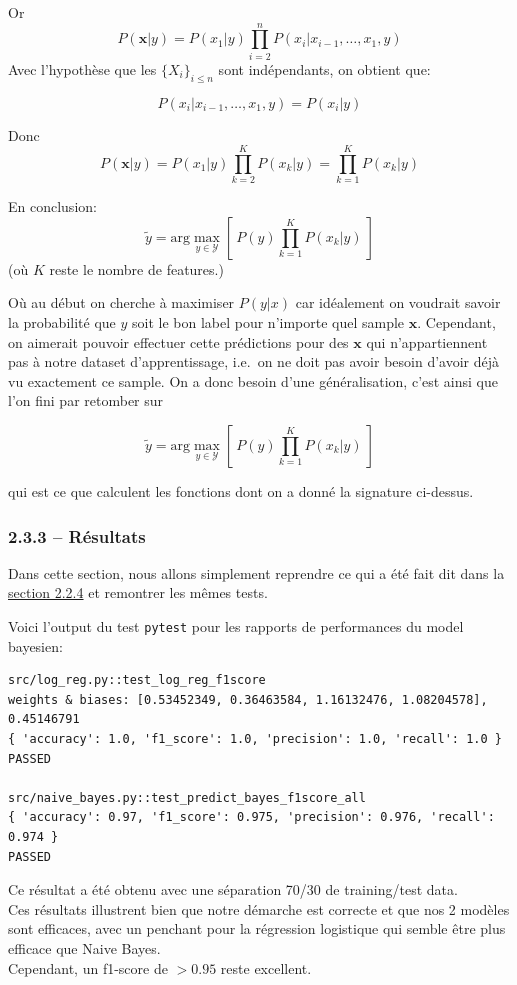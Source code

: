 \documentclass[
]{article}
\begin{document}
Or \[ 
P(\mathbf{x}| y) = P(x_1 | y) \prod_{i = 2}^{n}{P(x_i | x_{i-1}, \ldots, x_1, y)}
\] Avec l'hypothèse que les \(\{X_i\}_{i \leq n}\) sont indépendants, on
obtient que:

\[P(x_i | x_{i-1}, \ldots, x_1, y) = P(x_i | y)\]

Donc
\[P(\mathbf{x}|y) = P(x_1 | y) \prod_{k = 2}^{K}{P(x_k | y)} = \prod_{k=1}^K{P(x_k | y)}\]

En conclusion:
\[ \tilde{y} = \text{arg}\max_{y \in \mathcal{Y}} \left[\  P(y) \prod_{k = 1}^K{P(x_k | y)}\  \right] \]
(où \(K\) reste le nombre de features.)

Où au début on cherche à maximiser \(P(y | x)\) car idéalement on
voudrait savoir la probabilité que \(y\) soit le bon label pour
n'importe quel sample \(\mathbf{x}\). Cependant, on aimerait pouvoir
effectuer cette prédictions pour des \(\mathbf{x}\) qui n'appartiennent
pas à notre dataset d'apprentissage, i.e.~on ne doit pas avoir besoin
d'avoir déjà vu exactement ce sample. On a donc besoin d'une
généralisation, c'est ainsi que l'on fini par retomber sur

\[ \tilde{y} = \text{arg}\max_{y \in \mathcal{Y}} \left[\  P(y) \prod_{k = 1}^K{P(x_k | y)}\  \right] \]

qui est ce que calculent les fonctions dont on a donné la signature
ci-dessus.

\hypertarget{ruxe9sultats-1}{%
\subsubsection{2.3.3 -- Résultats}\label{ruxe9sultats-1}}

Dans cette section, nous allons simplement reprendre ce qui a été fait
dit dans la \href{#ruxe9sultats}{section 2.2.4} et remontrer les mêmes
tests.

Voici l'output du test \texttt{pytest} pour les rapports de performances
du model bayesien:

\begin{lstlisting}
src/log_reg.py::test_log_reg_f1score 
weights & biases: [0.53452349, 0.36463584, 1.16132476, 1.08204578], 0.45146791  
{ 'accuracy': 1.0, 'f1_score': 1.0, 'precision': 1.0, 'recall': 1.0 }
PASSED

src/naive_bayes.py::test_predict_bayes_f1score_all  
{ 'accuracy': 0.97, 'f1_score': 0.975, 'precision': 0.976, 'recall': 0.974 }
PASSED
\end{lstlisting}

Ce résultat a été obtenu avec une séparation 70/30 de training/test
data.\\
Ces résultats illustrent bien que notre démarche est correcte et que nos
2 modèles sont efficaces, avec un penchant pour la régression logistique
qui semble être plus efficace que Naive Bayes.\\
Cependant, un f1-score de \(> 0.95\) reste excellent.

\newpage{}

\printbibliography[heading=bibintoc, title={Références}]
\end{document}
